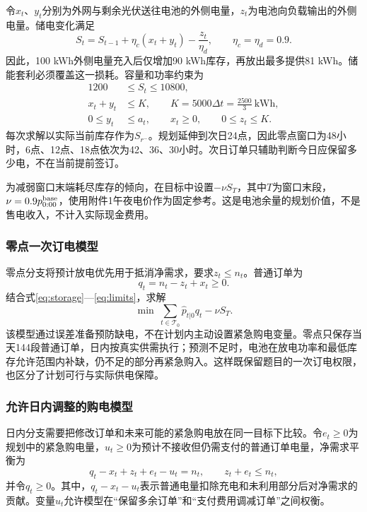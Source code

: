 \documentclass[11pt,a4paper]{article}
\begin{document}
令$x_t$、$y_t$分别为外网与剩余光伏送往电池的外侧电量，$z_t$为电池向负载输出的外侧电量。储电变化满足
\begin{equation}
 S_t=S_{t-1}+\eta_c(x_t+y_t)-\frac{z_t}{\eta_d},\qquad
 \eta_c=\eta_d=0.9.
 \label{eq:storage}
\end{equation}
因此，100 kWh外侧电量充入后仅增加90 kWh库存，再放出最多提供81 kWh。储能套利必须覆盖这一损耗。容量和功率约束为
\begin{align}
 1200&\le S_t\le10800,\\
 x_t+y_t&\le K,\qquad K=5000\Delta t=\frac{2500}{3}\ \mathrm{kWh},\\
 0\le y_t&\le a_t,\qquad x_t\ge0,\qquad 0\le z_t\le K.
 \label{eq:limits}
\end{align}
每次求解以实际当前库存作为$S_{r^-}$。规划延伸到次日24点，因此零点窗口为48小时，6点、12点、18点依次为42、36、30小时。次日订单只辅助判断今日应保留多少电，不在当前提前签订。

为减弱窗口末端耗尽库存的倾向，在目标中设置$-\nu S_T$，其中$T$为窗口末段，$\nu=0.9p^{\rm base}_{0:00}$，使用附件1午夜电价作为固定参考。这是电池余量的规划价值，不是售电收入，不计入实际现金费用。

\subsubsection{零点一次订电模型}

零点分支将预计放电优先用于抵消净需求，要求$z_t\le n_t$。普通订单为
\begin{equation}
 q_t=n_t-z_t+x_t\ge0.
\end{equation}
结合式\eqref{eq:storage}—\eqref{eq:limits}，求解
\begin{equation}
 \min\ \sum_{t\in\mathcal T_0}\widehat p_{t|0}q_t-\nu S_T.
 \label{eq:dayahead}
\end{equation}
该模型通过误差准备预防缺电，不在计划内主动设置紧急购电变量。零点只保存当天144段普通订单，日内按真实供需执行；预测不足时，电池在放电功率和最低库存允许范围内补缺，仍不足的部分再紧急购入。这样既保留题目的一次订电权限，也区分了计划可行与实际供电保障。

\subsubsection{允许日内调整的购电模型}

日内分支需要把修改订单和未来可能的紧急购电放在同一目标下比较。令$e_t\ge0$为规划中的紧急购电量，$u_t\ge0$为预计不接收但仍需支付的普通订单电量，净需求平衡为
\begin{equation}
 q_t-x_t+z_t+e_t-u_t=n_t,\qquad z_t+e_t\le n_t,
 \label{eq:balance}
\end{equation}
并令$q_t\ge0$。其中，$q_t-x_t-u_t$表示普通电量扣除充电和未利用部分后对净需求的贡献。变量$u_t$允许模型在“保留多余订单”和“支付费用调减订单”之间权衡。
\end{document}
